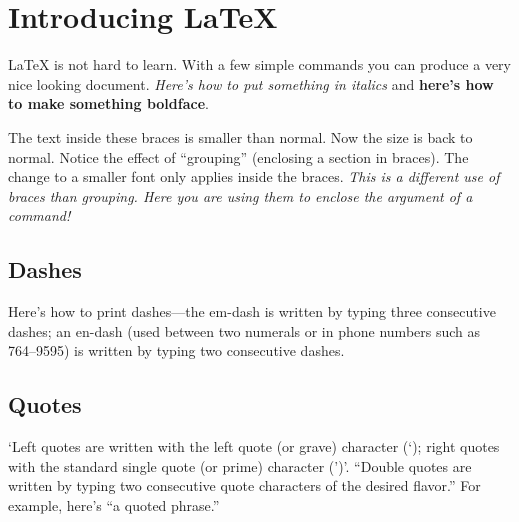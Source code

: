 \documentclass{article}                    %
\begin{document}
 
\section{Introducing LaTeX}                %
LaTeX is not hard to learn.  With a few simple commands you
can produce a very nice looking document.
\textit{Here's how to put something in italics} and 
\textbf{here's how to make something boldface}.

{\small The text inside these braces is smaller than normal.} Now the size
is back to normal.  
Notice the effect of ``grouping'' (enclosing a section in braces). 
The change to a smaller font only applies inside the braces. 
\textit{This is a different use of braces than grouping. Here you are
using them to enclose the argument of a command!}
  
\subsection{Dashes}                        %
Here's how to print dashes---the em-dash is written by typing three 
consecutive dashes; an en-dash (used between two numerals or in phone
numbers such as 764--9595) is written by typing two consecutive dashes. 

\subsection{Quotes}                        %
`Left quotes are written with the left quote (or grave) character (`); 
right quotes with the standard single quote (or prime) character (')'. 
``Double quotes are written by typing two consecutive quote characters 
of the desired flavor.'' For example, here's ``a quoted phrase.''
 
\end{document}
